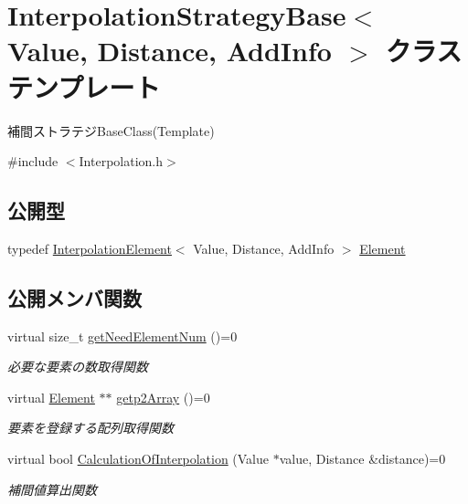 \hypertarget{class_interpolation_strategy_base}{}\section{Interpolation\+Strategy\+Base$<$ Value, Distance, Add\+Info $>$ クラステンプレート}
\label{class_interpolation_strategy_base}


補間ストラテジ\+Base\+Class(\+Template)  




{\ttfamily \#include $<$Interpolation.\+h$>$}

\subsection*{公開型}
\begin{DoxyCompactItemize}
\item 
typedef \mbox{\hyperlink{class_interpolation_element}{Interpolation\+Element}}$<$ Value, Distance, Add\+Info $>$ \mbox{\hyperlink{class_interpolation_strategy_base_abddda7a257538a53ad6030db831aab86}{Element}}
\end{DoxyCompactItemize}
\subsection*{公開メンバ関数}
\begin{DoxyCompactItemize}
\item 
virtual size\+\_\+t \mbox{\hyperlink{class_interpolation_strategy_base_a4d16fc821f0d503cc1fe4305022c4121}{get\+Need\+Element\+Num}} ()=0
\begin{DoxyCompactList}\small\item\em 必要な要素の数取得関数 \end{DoxyCompactList}\item 
virtual \mbox{\hyperlink{class_interpolation_strategy_base_abddda7a257538a53ad6030db831aab86}{Element}} $\ast$$\ast$ \mbox{\hyperlink{class_interpolation_strategy_base_aaccab96eb4f508e64a7a70f85c0e8d6a}{getp2\+Array}} ()=0
\begin{DoxyCompactList}\small\item\em 要素を登録する配列取得関数 \end{DoxyCompactList}\item 
virtual bool \mbox{\hyperlink{class_interpolation_strategy_base_a980a4c1dbf4ebfc094b0cd7edc256efe}{Calculation\+Of\+Interpolation}} (Value $\ast$value, Distance \&distance)=0
\begin{DoxyCompactList}\small\item\em 補間値算出関数 \end{DoxyCompactList}\end{DoxyCompactItemize}


